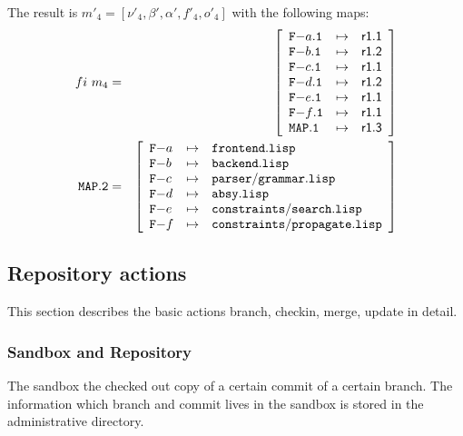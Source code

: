 \documentclass[fleqn, 10pt, a4paper]{article}
\begin{document}
The result is $m'_4=[\nu'_4, \beta', \alpha', f'_4, o'_4]$ with the
following maps:
\begin{eqnarray*}
\mathnormal{fi}\ m_4 &=& \left[
\begin{array}{lcl}
\mathtt{F-}a\mathtt{.1} & \mapsto & \mathsf{r1.1} \\
\mathtt{F-}b\mathtt{.1} & \mapsto & \mathsf{r1.2} \\
\mathtt{F-}c\mathtt{.1} & \mapsto & \mathsf{r1.1} \\
\mathtt{F-}d\mathtt{.1} & \mapsto & \mathsf{r1.2} \\
\mathtt{F-}e\mathtt{.1} & \mapsto & \mathsf{r1.1} \\
\mathtt{F-}f\mathtt{.1} & \mapsto & \mathsf{r1.1} \\
\mathtt{MAP.1}         & \mapsto & \mathsf{r1.3} \\
\end{array}\right] \\
\mathtt{MAP.2} &=& \left[
\begin{array}{lcl}
\mathtt{F-}a &\mapsto& \mathtt{frontend.lisp} \\
\mathtt{F-}b &\mapsto& \mathtt{backend.lisp} \\
\mathtt{F-}c &\mapsto& \mathtt{parser/grammar.lisp} \\
\mathtt{F-}d &\mapsto& \mathtt{absy.lisp} \\
\mathtt{F-}e &\mapsto& \mathtt{constraints/search.lisp} \\
\mathtt{F-}f &\mapsto& \mathtt{constraints/propagate.lisp} \\
\end{array}\right]
\end{eqnarray*}


\subsection{Repository actions}

This section describes the basic actions branch, checkin, merge,
update in detail.

\subsubsection{Sandbox and Repository}

The sandbox the checked out copy of a certain commit
of a certain branch. The information which branch and
commit lives in the sandbox is stored in the administrative
directory.
\end{document}
